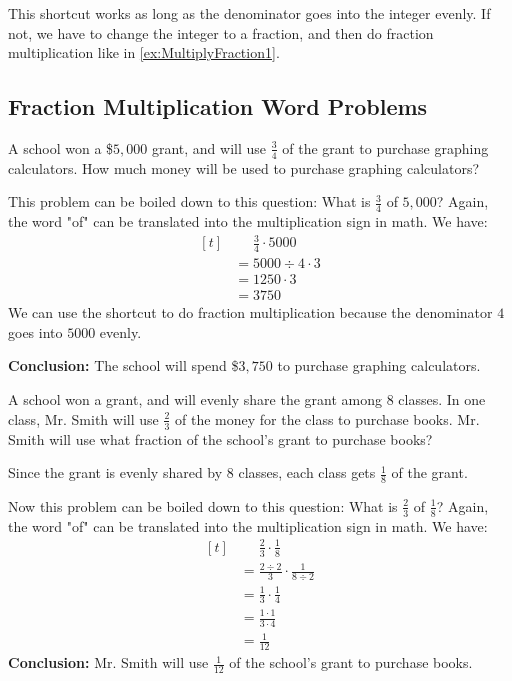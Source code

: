 This shortcut works as long as the denominator goes into the integer evenly. If not, we have to change the integer to a fraction, and then do fraction multiplication like in \cref{ex:MultiplyFraction1}.

\subsection{Fraction Multiplication Word Problems}
\begin{myexample}
A school won a \$$5,000$ grant, and will use $\frac{3}{4}$ of the grant to purchase graphing calculators. How much money will be used to purchase graphing calculators?
\end{myexample}
\begin{solution}
This problem can be boiled down to this question: What is $\frac{3}{4}$ of $5,000$? Again, the word "of" can be translated into the multiplication sign in math. We have:
\[ 
\begin{aligned}[t]
	&\phantom{{}=}\frac{3}{4} \cdot 5000 \\
	&= 5000\div4\cdot3 \\
	&= 1250\cdot3 \\
	&= 3750
\end{aligned}
\]
We can use the shortcut to do fraction multiplication because the denominator $4$ goes into $5000$ evenly.

\textbf{Conclusion:} The school will spend \$$3,750$ to purchase graphing calculators.
\end{solution}

\begin{myexample}
A school won a grant, and will evenly share the grant among $8$ classes. In one class, Mr. Smith will use $\frac{2}{3}$ of the money for the class to purchase books. Mr. Smith will use what fraction of the school's grant to purchase books?
\end{myexample}
\begin{solution}
Since the grant is evenly shared by $8$ classes, each class gets $\frac{1}{8}$ of the grant.

Now this problem can be boiled down to this question: What is $\frac{2}{3}$ of $\frac{1}{8}$? Again, the word "of" can be translated into the multiplication sign in math. We have:
\[ 
\begin{aligned}[t]
	&\phantom{{}=}\frac{2}{3} \cdot \frac{1}{8} \\
	&= \frac{2\div2}{3} \cdot \frac{1}{8\div2} \\
	&= \frac{1}{3} \cdot \frac{1}{4} \\
	&= \frac{1\cdot1}{3\cdot4} \\
	&= \frac{1}{12}
\end{aligned}
\]
\textbf{Conclusion:} Mr. Smith will use $\frac{1}{12}$ of the school's grant to purchase books.
\end{solution}

